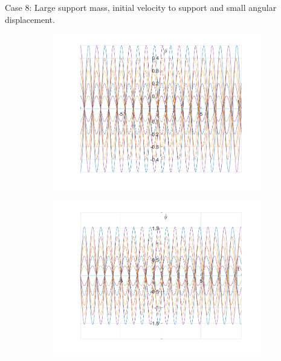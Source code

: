 \documentclass{article}
\begin{document}
	Case 8:
	Large support mass, initial velocity to support and small angular displacement.
	\begin{figure}[h!]
		\centering
		\begin{subfigure}[b]{0.48\linewidth}
			\includegraphics[width=\linewidth]{./SmallOscillations/S8/F1.png}
		\end{subfigure}
		\begin{subfigure}[b]{0.48\linewidth}
			\includegraphics[width=\linewidth]{./SmallOscillations/S8/F2.png}
		\end{subfigure}
	\end{figure}
	
\end{document}
